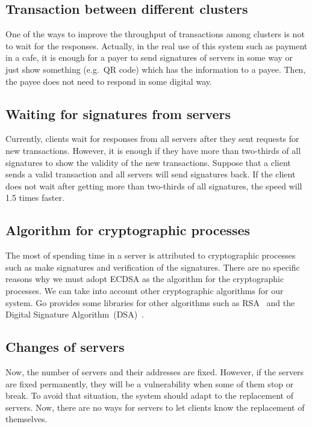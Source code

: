 \documentclass[a4paper, oneside]{discothesis}
\begin{document}
\subsection{Transaction between different clusters}
One of the ways to improve the throughput of transactions among clusters is not to wait
for the responses.
Actually, in the real use of this system such as payment in a cafe,
it is enough for a payer to send signatures of servers in some way
or just show something (e.g.\ QR code) which has the information to a payee.
Then, the payee does not need to respond in some digital way.


\subsection{Waiting for signatures from servers}
Currently, clients wait for responses from all servers
after they sent requests for new transactions.
However, it is enough if they have more than two-thirds of all signatures
to show the validity of the new transactions.
Suppose that a client sends a valid transaction and all servers will send signatures back.
If the client does not wait after getting more than two-thirds of all signatures,
the speed will 1.5 times faster.


\subsection{Algorithm for cryptographic processes}
The most of spending time in a server is attributed to cryptographic processes
such as make signatures and verification of the signatures.
There are no specific reasons why we must adopt ECDSA as the algorithm
for the cryptographic processes.
We can take into account other cryptographic algorithms for our system.
Go provides some libraries for other algorithms
such as RSA~\cite{rsa} and the Digital Signature Algorithm~(DSA)~\cite{dsa}.



\subsection{Changes of servers}
Now, the number of servers and their addresses are fixed.
However, if the servers are fixed permanently, they will be a vulnerability
when some of them stop or break.
To avoid that situation, the system should adapt to the replacement of servers.
Now, there are no ways for servers to let clients know the replacement of themselves.
\end{document}
